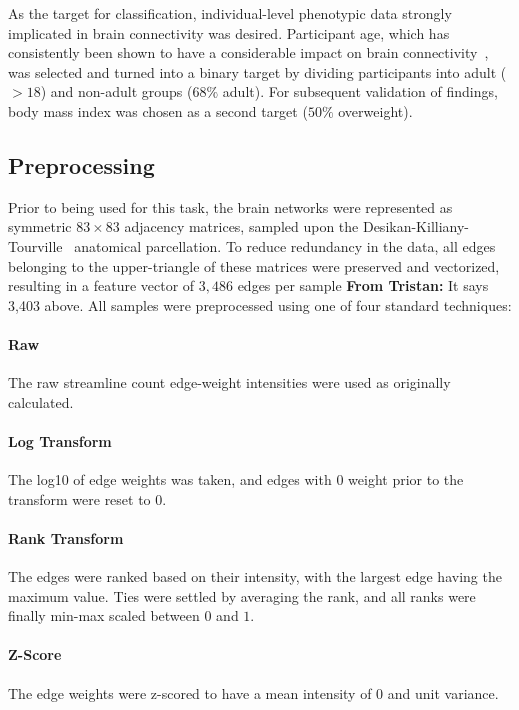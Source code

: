 \documentclass[10pt]{SelfArx} %
\newcommand{\tristan}[1]{\colorlet{saved}{.}\color{orange}\textbf{From Tristan:} #1\color{saved}\xspace}
\newcommand{\new}[1]{\color{blue}#1\color{black}\xspace}
\begin{document}
As the target for classification, individual-level phenotypic data strongly implicated in brain connectivity was
desired. Participant age, which has consistently been shown to have a considerable impact on brain
connectivity~\cite{Meier2012-ve,Wu2012-uc,Bookheimer2019-ti,Zhao2015-rm}, was selected and turned into a binary target
by dividing participants into adult ($>18$) and non-adult groups ($68\%$ adult). \new{For subsequent validation of
findings, body mass index was chosen as a second target ($50\%$ overweight).}

\subsection*{Preprocessing}
Prior to being used for this task, the brain networks were represented as symmetric $83 \times 83$ adjacency
matrices, sampled upon the Desikan-Killiany-Tourville~\cite{Klein2012-vi} anatomical parcellation. To reduce redundancy
in the data, all edges belonging to the upper-triangle of these matrices were preserved and vectorized, resulting in a
feature vector of $3,486$ edges per sample \tristan{It says 3,403 above}. All samples were preprocessed using one of four standard techniques:

\paragraph{Raw} The raw streamline count edge-weight intensities were used as originally calculated.

\paragraph{Log Transform} The log10 of edge weights was taken, and edges with $0$ weight prior to the transform were
reset to $0$.

\paragraph{Rank Transform} The edges were ranked based on their intensity, with the largest edge having the maximum
value. Ties were settled by averaging the rank, and all ranks were finally min-max scaled between $0$ and $1$.

\paragraph{Z-Score} The edge weights were z-scored to have a mean intensity of $0$ and unit variance.
\end{document}
